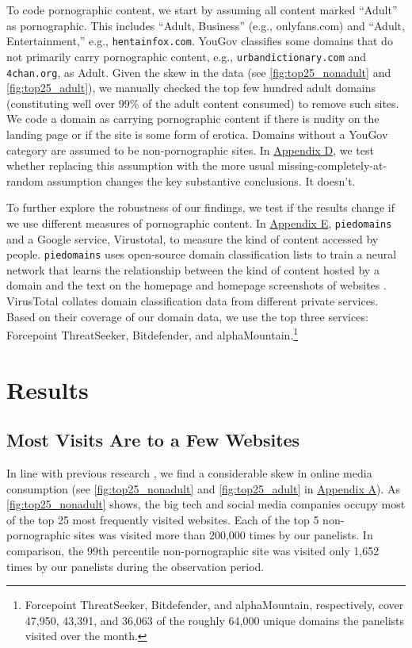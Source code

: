 \documentclass[12pt,twoside]{article}
\begin{document}
To code pornographic content, we start by assuming all content marked ``Adult'' as pornographic. This includes ``Adult, Business'' (e.g., onlyfans.com) and ``Adult, Entertainment,'' e.g., \texttt{hentainfox.com}. YouGov classifies some domains that do not primarily carry pornographic content, e.g., \texttt{urbandictionary.com} and \texttt{4chan.org}, as Adult. Given the skew in the data (see \cref{fig:top25_nonadult} and \cref{fig:top25_adult}), we manually checked the top few hundred adult domains (constituting well over 99\% of the adult content consumed) to remove such sites. We code a domain as carrying pornographic content if there is nudity on the landing page or if the site is some form of erotica. Domains without a YouGov category are assumed to be non-pornographic sites. In \hyperref[sm:smD]{Appendix D}, we test whether replacing this assumption with the more usual missing-completely-at-random assumption changes the key substantive conclusions. It doesn't.

To further explore the robustness of our findings, we test if the results change if we use different measures of pornographic content. In \hyperref[sm:smE]{Appendix E},  \texttt{piedomains} and a Google service, Virustotal, to measure the kind of content accessed by people. \texttt{piedomains} uses open-source domain classification lists to train a neural network that learns the relationship between the kind of content hosted by a domain and the text on the homepage and homepage screenshots of websites \citep{Chintalapati_piedomains_Predict_the_2022}. VirusTotal collates domain classification data from different private services. Based on their coverage of our domain data, we use the top three services: Forcepoint ThreatSeeker, Bitdefender, and alphaMountain.\footnote{Forcepoint ThreatSeeker, Bitdefender, and alphaMountain, respectively, cover 47,950, 43,391, and 36,063 of the roughly 64,000 unique domains the panelists visited over the month.}


\section{Results}\label{sec:results}
\subsection{Most Visits Are to a Few Websites}
\label{subsec:concentration_media_consumption}

In line with previous research \citep{hindman2009myth, Dewan2004-tt}, we find a considerable skew in online media consumption (see \cref{fig:top25_nonadult} and \cref{fig:top25_adult} in \hyperref[sm:smA]{Appendix A}). As \cref{fig:top25_nonadult} shows, the big tech and social media companies occupy most of the top 25 most frequently visited websites. Each of the top 5 non-pornographic sites was visited more than 200,000 times by our panelists. In comparison, the 99th percentile non-pornographic site was visited only 1,652 times by our panelists during the observation period. 
\end{document}
